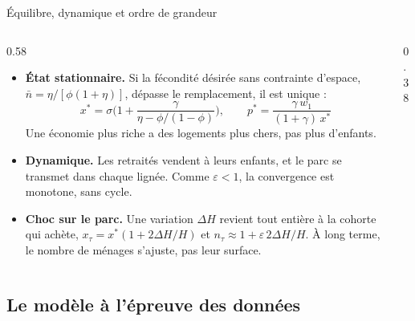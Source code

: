 \documentclass[10pt,aspectratio=169]{beamer}
\begin{document}
\begin{frame}{Équilibre, dynamique et ordre de grandeur}
	\begin{columns}[T]
		\begin{column}{0.58\textwidth}
			\footnotesize
			\begin{itemize}\setlength{\itemsep}{0.4em}
				\item \textbf{État stationnaire.} Si la fécondité désirée sans contrainte d'espace, $\bar n = \eta/[\phi(1+\eta)]$, dépasse le remplacement, il est unique :
				\[ x^* = \sigma\Big(1 + \frac{\gamma}{\eta - \phi/(1-\phi)}\Big), \qquad p^* = \frac{\gamma\, w_1}{(1+\gamma)\, x^*} \]
				Une économie plus riche a des logements plus chers, pas plus d'enfants.
				\item \textbf{Dynamique.} Les retraités vendent à leurs enfants, et le parc se transmet dans chaque lignée. Comme $\varepsilon < 1$, la convergence est monotone, sans cycle.
				\item \textbf{Choc sur le parc.} Une variation $\Delta H$ revient tout entière à la cohorte qui achète, $x_{\tau} = x^*(1 + 2\Delta H/H)$ et $n_{\tau} \approx 1 + \varepsilon\, 2\Delta H/H$. À long terme, le nombre de ménages s'ajuste, pas leur surface.
			\end{itemize}
		\end{column}
		\begin{column}{0.38\textwidth}
			\vspace{0.15cm}
		\end{column}
	\end{columns}
\end{frame}

\subsection{Le modèle à l'épreuve des données}
\end{document}
